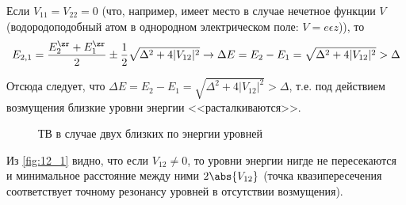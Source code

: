 Если $V_{11} = V_{22} = 0$ (что, например, имеет место в случае нечетное функции $V$ (водородоподобный атом в однородном электрическом поле: $V = e \epsilon z$)), то 
$$
E_{2, 1}=\frac{E_2^\zr + E_1^\zr}{2} \pm \frac{1}{2} \sqrt{\Delta^2 + 4 |V_{12}|^2} \to \Delta E = E_2 - E_1 = \sqrt{\Delta^2 + 4 |V_{12}|^2} > \Delta
$$

Отсюда следует, что $\Delta E = E_2 - E_1 = \sqrt{\Delta^2 + 4 |V_{12}|^2} > \Delta$, т.е. под действием возмущения близкие уровни энергии <<расталкиваются>>.

\begin{figure}[h!]
\centering
{}
\caption{ТВ в случае двух близких по энергии уровней} \label{fig:12_1}
\end{figure}

Из \autoref{fig:12_1} видно, что если $V_{12} \neq 0$, то уровни энергии нигде не пересекаются и минимальное расстояние между ними $2\abs{V_{12}}$ (точка квазипересечения соответствует точному резонансу уровней в отсутствии возмущения).